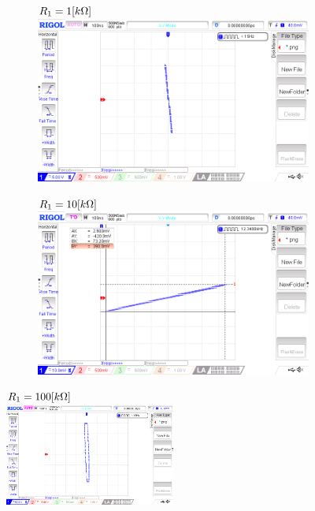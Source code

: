 \documentclass{article}
\begin{document}
\begin{figure}[H]
  \begin{figure}[H]
    \begin{minipage}[t]{0.49\textwidth}
      \(R_1 = 1\-[k\Omega]\)\\
      \includegraphics[width=\textwidth]{LAB/NewFile14.png}
    \end{minipage}
    \hfill
    \begin{minipage}[t]{0.49\textwidth}
      \(R_1 = 10\-[k\Omega]\)\\
      \includegraphics[width=\textwidth]{LAB/NewFile06.png}
    \end{minipage}
    \vspace{-4mm}
  \end{figure}
\end{figure}

\begin{figure}[H]
  \centering
  \(R_1 = 100\-[k\Omega]\)\\
  \includegraphics[width=0.5\textwidth]{LAB/NewFile13.png}
\end{figure}
\end{document}
